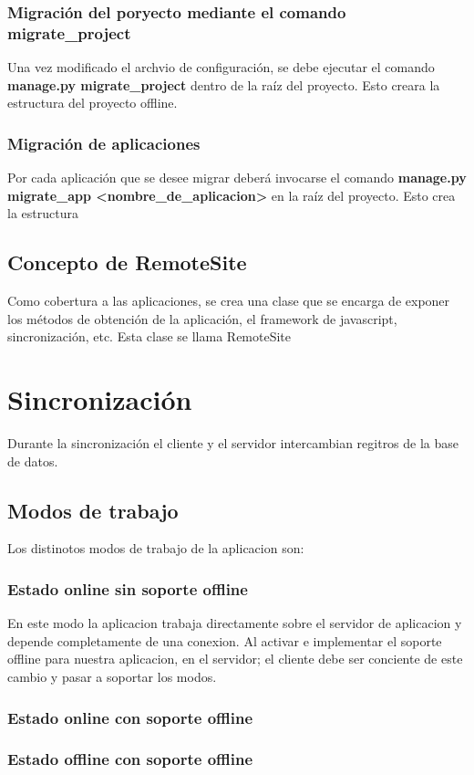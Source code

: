 \documentclass[a4paper]{report}
\begin{document}
\subsubsection{Migración del poryecto mediante el comando migrate\_project}
Una vez modificado el archvio de configuración, se debe ejecutar el comando
\textbf{manage.py migrate\_project} dentro de la raíz del proyecto. Esto creara
la estructura del proyecto offline.

\subsubsection{Migración de aplicaciones}
Por cada aplicación que se desee migrar deberá invocarse el comando 
\textbf{manage.py migrate\_app <nombre\_de\_aplicacion>} en la raíz del
proyecto. Esto crea la estructura 
 

\subsection{Concepto de RemoteSite}
Como cobertura a las aplicaciones, se crea una clase que se encarga de exponer
los métodos de obtención de la aplicación, el framework de javascript,
sincronización, etc. Esta clase se llama RemoteSite

\section{Sincronización}
Durante la sincronización el cliente y el servidor intercambian regitros de 
la base de datos. 

\subsection{Modos de trabajo}
Los distinotos modos de trabajo de la aplicacion son:
\subsubsection{Estado online sin soporte offline}
En este modo la aplicacion trabaja directamente sobre el servidor de aplicacion
y depende completamente de una conexion.
Al activar e implementar el soporte offline para nuestra aplicacion, en el
servidor; el cliente debe ser conciente de este cambio y pasar a soportar los
modos.
\subsubsection{Estado online con soporte offline}
\subsubsection{Estado offline con soporte offline}
\end{document}
